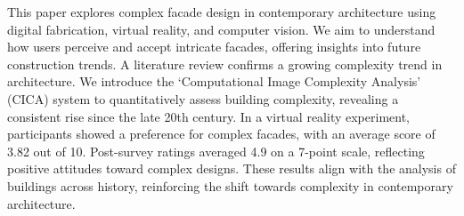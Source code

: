 
This paper explores complex facade design in contemporary architecture using digital fabrication, virtual reality, and computer vision.
We aim to understand how users perceive and accept intricate facades, offering insights into future construction trends.
A literature review confirms a growing complexity trend in architecture.
We introduce the `Computational Image Complexity Analysis' (CICA) system to quantitatively assess building complexity, revealing a consistent rise since the late 20th century.
In a virtual reality experiment, participants showed a preference for complex facades, with an average score of 3.82 out of 10.
Post-survey ratings averaged 4.9 on a 7-point scale, reflecting positive attitudes toward complex designs.
These results align with the analysis of buildings across history, reinforcing the shift towards complexity in contemporary architecture.

